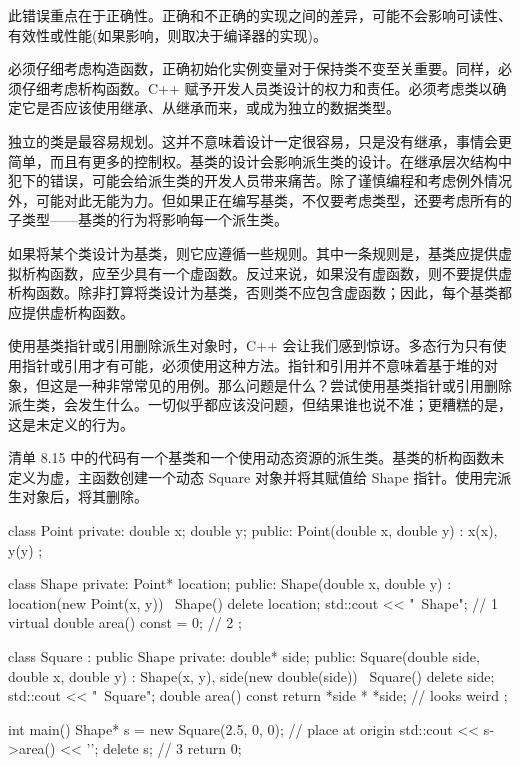 此错误重点在于正确性。正确和不正确的实现之间的差异，可能不会影响可读性、有效性或性能(如果影响，则取决于编译器的实现)。

必须仔细考虑构造函数，正确初始化实例变量对于保持类不变至关重要。同样，必须仔细考虑析构函数。C++ 赋予开发人员类设计的权力和责任。必须考虑类以确定它是否应该使用继承、从继承而来，或成为独立的数据类型。


独立的类是最容易规划。这并不意味着设计一定很容易，只是没有继承，事情会更简单，而且有更多的控制权。基类的设计会影响派生类的设计。在继承层次结构中犯下的错误，可能会给派生类的开发人员带来痛苦。除了谨慎编程和考虑例外情况外，可能对此无能为力。但如果正在编写基类，不仅要考虑类型，还要考虑所有的子类型——基类的行为将影响每一个派生类。

如果将某个类设计为基类，则它应遵循一些规则。其中一条规则是，基类应提供虚拟析构函数，应至少具有一个虚函数。反过来说，如果没有虚函数，则不要提供虚析构函数。除非打算将类设计为基类，否则类不应包含虚函数；因此，每个基类都应提供虚析构函数。

使用基类指针或引用删除派生对象时，C++ 会让我们感到惊讶。多态行为只有使用指针或引用才有可能，必须使用这种方法。指针和引用并不意味着基于堆的对象，但这是一种非常常见的用例。那么问题是什么？尝试使用基类指针或引用删除派生类，会发生什么。一切似乎都应该没问题，但结果谁也说不准；更糟糕的是，这是未定义的行为。

清单 8.15 中的代码有一个基类和一个使用动态资源的派生类。基类的析构函数未定义为虚，主函数创建一个动态 Square 对象并将其赋值给 Shape 指针。使用完派生对象后，将其删除。


\begin{cpp}
class Point {
private:
  double x;
  double y;
public:
  Point(double x, double y) : x(x), y(y) {}
};

class Shape {
private:
  Point* location;
public:
  Shape(double x, double y) : location(new Point(x, y)) {}
  ~Shape() { delete location; std::cout << "~Shape\n"; } // 1
  virtual double area() const = 0; // 2
};

class Square : public Shape {
private:
  double* side;
public:
  Square(double side, double x, double y) : Shape(x, y),
  side(new double(side)) {}
  ~Square() { delete side; std::cout << "~Square\n"; }
  double area() const { return *side * *side; } // looks weird
};

int main() {
  Shape* s = new Square(2.5, 0, 0); // place at origin
  std::cout << s->area() << '\n';
  delete s; // 3
  return 0;
}
\end{cpp}

